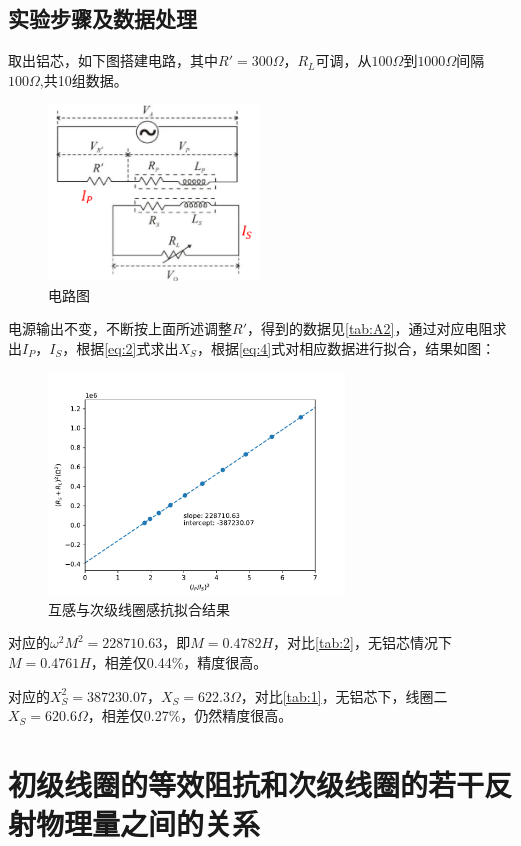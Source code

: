 \documentclass[12pt]{article}
\begin{document}
\subsection*{实验步骤及数据处理}
取出铝芯，如下图搭建电路，其中$R'=300\Omega$，$R_L$可调，从$100\Omega$到$1000\Omega$间隔$100\Omega$,共10组数据。
\begin{figure}[H]
    \centering
    \includegraphics[width=0.5\textwidth]{fig_circuit.png}
    \caption{电路图}
    \label{fig:1}
\end{figure}
电源输出不变，不断按上面所述调整$R'$，得到的数据见\ref{tab:A2}，通过对应电阻求出$I_P$，$I_S$，根据\ref{eq:2}式求出$X_S$，根据\ref{eq:4}式对相应数据进行拟合，结果如图：
\begin{figure}[H]
    \centering
    \includegraphics[width=0.7\textwidth]{fig_opt1.pdf}
    \caption{互感与次级线圈感抗拟合结果}
    \label{fig:2}
\end{figure}
对应的$\omega^2 M^2 = 228710.63$，即$M = 0.4782H$，对比\ref{tab:2}，无铝芯情况下$M = 0.4761H$，相差仅0.44\%，精度很高。

对应的$X_S^2 = 387230.07$，$X_S=622.3\Omega$，对比\ref{tab:1}，无铝芯下，线圈二$X_S=620.6\Omega$，相差仅0.27\%，仍然精度很高。

\section{初级线圈的等效阻抗和次级线圈的若干反射物理量之间的关系}
\end{document}
